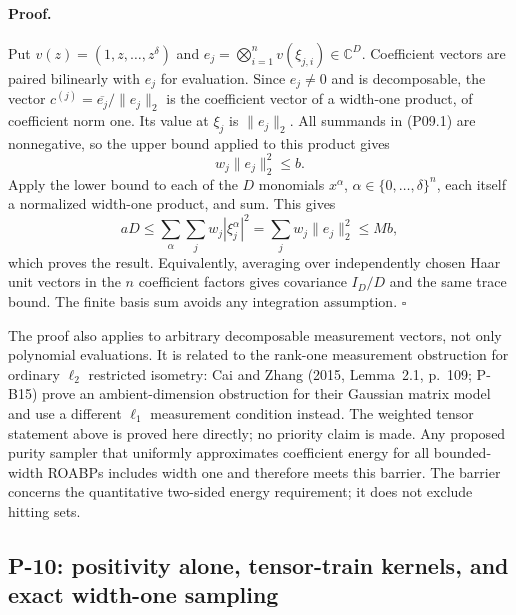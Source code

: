 \documentclass[11pt,a4paper]{article}
\theoremstyle{definition}\newtheorem{definition}{Definition}
\begin{document}
\paragraph{Proof.}
Put $v(z)=(1,z,\ldots,z^\delta)$ and
$e_j=\bigotimes_{i=1}^n v(\xi_{j,i})\in\mathbb C^D$.
Coefficient vectors are paired bilinearly with $e_j$ for evaluation.
Since $e_j\ne0$ and is decomposable, the vector
$c^{(j)}=\overline{e_j}/\|e_j\|_2$ is the coefficient vector of a width-one product, of coefficient norm one. Its value at $\xi_j$ is $\|e_j\|_2$. All summands in (P09.1) are nonnegative, so the upper bound applied to this product gives
\[
 w_j\|e_j\|_2^2\le b.
\]
Apply the lower bound to each of the $D$ monomials $x^\alpha$, $\alpha\in\{0,\ldots,\delta\}^n$, each itself a normalized width-one product, and sum. This gives
\[
 aD\le\sum_\alpha\sum_j w_j|\xi_j^\alpha|^2
 =\sum_j w_j\|e_j\|_2^2\le Mb,
\]
which proves the result. Equivalently, averaging over independently chosen Haar unit vectors in the $n$ coefficient factors gives covariance $I_D/D$ and the same trace bound. The finite basis sum avoids any integration assumption. $\square$

The proof also applies to arbitrary decomposable measurement vectors, not only polynomial evaluations. It is related to the rank-one measurement obstruction for ordinary $\ell_2$ restricted isometry: Cai and Zhang (2015, Lemma~2.1, p.~109; P-B15) prove an ambient-dimension obstruction for their Gaussian matrix model and use a different $\ell_1$ measurement condition instead. The weighted tensor statement above is proved here directly; no priority claim is made. Any proposed purity sampler that uniformly approximates coefficient energy for all bounded-width ROABPs includes width one and therefore meets this barrier. The barrier concerns the quantitative two-sided energy requirement; it does not exclude hitting sets.

\subsection{P-10: positivity alone, tensor-train kernels, and exact width-one sampling}
\end{document}
